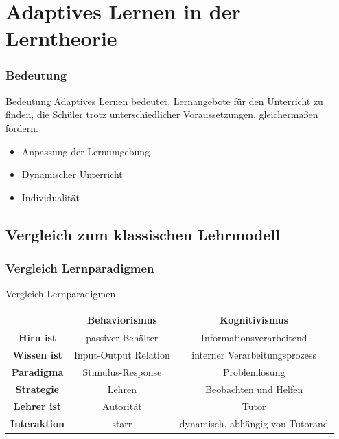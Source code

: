 \documentclass{beamer}
\begin{document}
\section{Adaptives Lernen in der Lerntheorie}
  \begin{frame}
    \frametitle{Bedeutung}
    \begin{block}{Bedeutung}
      Adaptives Lernen bedeutet, Lernangebote für den Unterricht zu finden, die Schüler trotz unterschiedlicher Voraussetzungen, gleichermaßen fördern.
    \end{block}

    \centering
    \begin{itemize}
      \item Anpassung der Lernumgebung
      \item Dynamischer Unterricht
      \item Individualität
    \end{itemize}
  \end{frame}
\subsection{Vergleich zum klassischen Lehrmodell}
  \begin{frame}
   \frametitle{Vergleich Lernparadigmen}
   \begin{block}{Vergleich Lernparadigmen}
      \begin{table}[!htbp]
        \centering
        \begin{tabular}{c || c | c}
          \hline
          \  & \textbf{Behaviorismus} & \textbf{Kognitivismus} \\
          \hline
          \textbf{Hirn ist} & passiver Behälter & Informationsverarbeitend \\
          \textbf{Wissen ist} & Input-Output Relation & interner Verarbeitungsprozess \\
          \textbf{Paradigma} & Stimulus-Response & Problemlösung  \\
          \textbf{Strategie} & Lehren & Beobachten und Helfen \\
          \textbf{Lehrer ist} & Autorität & Tutor \\
          \textbf{Interaktion} & starr & dynamisch, abhängig von Tutorand \\
        \end{tabular}
      \end{table}
   \end{block}
  \end{frame}
\end{document}
